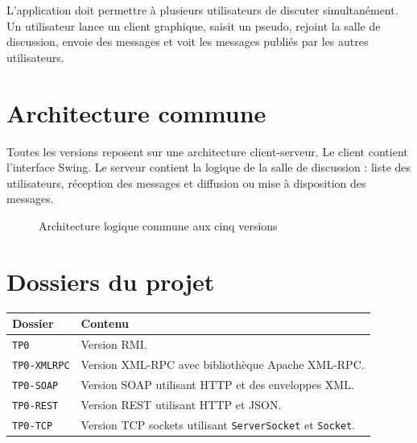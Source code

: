 \documentclass[12pt,a4paper]{report}
\begin{document}
L'application doit permettre à plusieurs utilisateurs de discuter simultanément. Un utilisateur lance un client graphique, saisit un pseudo, rejoint la salle de discussion, envoie des messages et voit les messages publiés par les autres utilisateurs.

\section{Architecture commune}

Toutes les versions reposent sur une architecture client-serveur. Le client contient l'interface Swing. Le serveur contient la logique de la salle de discussion : liste des utilisateurs, réception des messages et diffusion ou mise à disposition des messages.

\begin{figure}[H]
\centering
{}
\caption{Architecture logique commune aux cinq versions}
\end{figure}

\section{Dossiers du projet}

\begin{longtable}{|p{4cm}|p{9cm}|}
\hline
\textbf{Dossier} & \textbf{Contenu} \\
\hline
\texttt{TP0} & Version RMI. \\
\hline
\texttt{TP0-XMLRPC} & Version XML-RPC avec bibliothèque Apache XML-RPC. \\
\hline
\texttt{TP0-SOAP} & Version SOAP utilisant HTTP et des enveloppes XML. \\
\hline
\texttt{TP0-REST} & Version REST utilisant HTTP et JSON. \\
\hline
\texttt{TP0-TCP} & Version TCP sockets utilisant \texttt{ServerSocket} et \texttt{Socket}. \\
\hline
\end{longtable}
\end{document}

